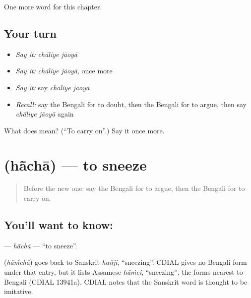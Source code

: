 \begin{grammarlens}[title={What you've built}]
One more word for this chapter.
\end{grammarlens}

\subsection*{Your turn}
\begin{itemize}
\raggedright
  \item \emph{Say it:} \emph{chāliye jāoyā}
  \item \emph{Say it:} \emph{chāliye jāoyā}, once more
  \item \emph{Say it:} say \emph{chāliye jāoyā}
  \item \emph{Recall:} say the Bengali for to doubt, then the Bengali for to argue, then say \emph{chāliye jāoyā} again
\end{itemize}

\begin{tcolorbox}[breakable,colback=teal!4,colframe=teal!35!black,title={Before you move on}]
What does   mean? (\textquotedblleft{}To carry on\textquotedblright{}.) Say it once more.
\end{tcolorbox}
\section[\texorpdfstring{\bn{হাঁচা} (hā̃chā)}{হাঁচা (hā̃chā)}]{ (hā̃chā) — to sneeze}

\label{lesson:BN-C150-hacha}



\begin{quote}
Before the new one: say the Bengali for to argue, then the Bengali for to carry on.
\end{quote}

\subsection*{You'll want to know: }
\textbf{} — \emph{hā̃chā} — \textquotedblleft{}to sneeze\textquotedblright{}.

\begin{cousinweb}
\textbf{} (\emph{hāṁchā}) goes back to Sanskrit \emph{hañji}, \textquotedblleft{}sneezing\textquotedblright{}. CDIAL gives no Bengali form under that entry, but it lists Assamese \emph{hāṁci}, \textquotedblleft{}sneezing\textquotedblright{}, the forms nearest to Bengali (CDIAL 13941a). CDIAL notes that the Sanskrit word is thought to be imitative.
\end{cousinweb}

